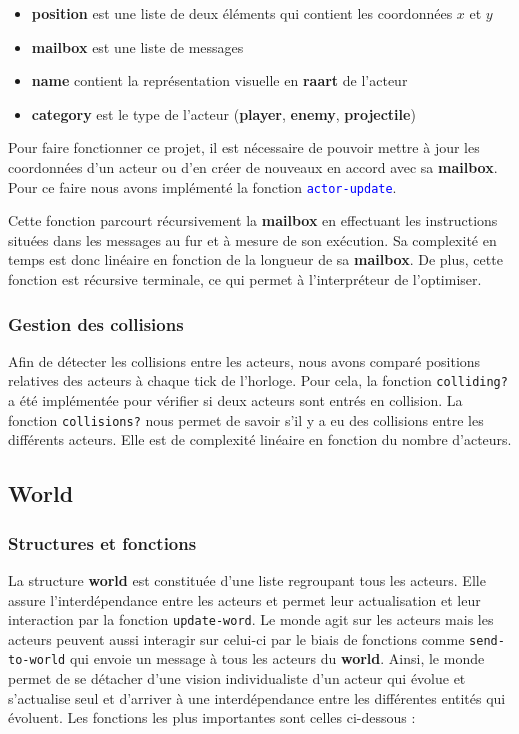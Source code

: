 \documentclass{article}
\begin{document}
 
\begin{itemize}
    \item \textbf{position} est une liste de deux éléments qui contient les coordonnées $x$ et $y$
    \item \textbf{mailbox} est une liste de messages
    \item \textbf{name} contient la représentation visuelle en \textbf{raart} de l’acteur
    \item \textbf{category} est le type de l’acteur (\textbf{player}, \textbf{enemy}, \textbf{projectile})
\end{itemize}

Pour faire fonctionner ce projet, il est nécessaire de pouvoir mettre à jour les coordonnées d'un acteur ou d'en créer de nouveaux en accord avec sa \textbf{mailbox}. Pour ce faire nous avons implémenté la fonction \textcolor{blue}{\lstinline{actor-update}}.

Cette fonction parcourt récursivement la \textbf{mailbox} en effectuant les instructions situées dans les messages au fur et à mesure de son exécution. Sa complexité en temps est donc linéaire en fonction de la longueur de sa \textbf{mailbox}. De plus, cette fonction est récursive terminale, ce qui permet à l'interpréteur de l'optimiser.

\subsubsection{Gestion des collisions}
Afin de détecter les collisions entre les acteurs, nous avons comparé positions relatives des acteurs à chaque tick de l'horloge. Pour cela, la fonction \lstinline{colliding?} a été implémentée pour vérifier si deux acteurs sont entrés en collision. La fonction \lstinline{collisions?} nous permet de savoir s'il y a eu des collisions entre les différents acteurs. Elle est de complexité linéaire en fonction du nombre d'acteurs.

\subsection{World}

\subsubsection{Structures et fonctions}

La structure \textbf{world} est constituée d'une liste regroupant tous les acteurs. Elle assure l'interdépendance entre les acteurs et permet leur actualisation et leur interaction par la fonction \lstinline{update-word}. Le monde agit sur les acteurs mais les acteurs peuvent aussi interagir sur celui-ci par le biais de fonctions comme \lstinline{send-to-world} qui envoie un message à tous les acteurs du \textbf{world}. Ainsi, le monde permet de se détacher d'une vision individualiste d'un acteur qui évolue et s'actualise seul et d'arriver à une interdépendance entre les différentes entités qui évoluent. Les fonctions les plus importantes sont celles ci-dessous : 
\end{document}
